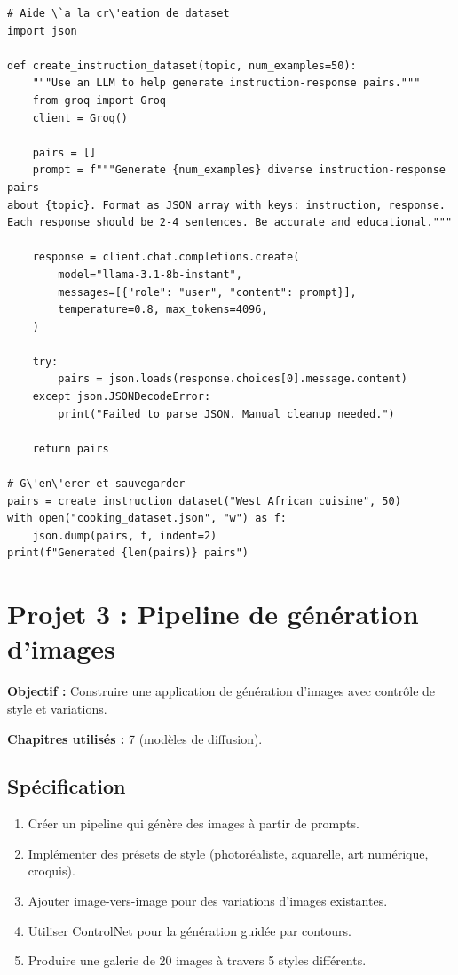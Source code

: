 \begin{verbatim}
# Aide \`a la cr\'eation de dataset
import json

def create_instruction_dataset(topic, num_examples=50):
    """Use an LLM to help generate instruction-response pairs."""
    from groq import Groq
    client = Groq()

    pairs = []
    prompt = f"""Generate {num_examples} diverse instruction-response pairs
about {topic}. Format as JSON array with keys: instruction, response.
Each response should be 2-4 sentences. Be accurate and educational."""

    response = client.chat.completions.create(
        model="llama-3.1-8b-instant",
        messages=[{"role": "user", "content": prompt}],
        temperature=0.8, max_tokens=4096,
    )

    try:
        pairs = json.loads(response.choices[0].message.content)
    except json.JSONDecodeError:
        print("Failed to parse JSON. Manual cleanup needed.")

    return pairs

# G\'en\'erer et sauvegarder
pairs = create_instruction_dataset("West African cuisine", 50)
with open("cooking_dataset.json", "w") as f:
    json.dump(pairs, f, indent=2)
print(f"Generated {len(pairs)} pairs")
\end{verbatim}

\section{Projet 3 : Pipeline de g\'en\'eration d'images}

\textbf{Objectif :} Construire une application de g\'en\'eration d'images avec contr\^ole de style et variations.

\textbf{Chapitres utilis\'es :} 7 (mod\`eles de diffusion).

\subsection{Sp\'ecification}

\begin{enumerate}
  \item Cr\'eer un pipeline qui g\'en\`ere des images \`a partir de prompts.
  \item Impl\'ementer des pr\'esets de style (photor\'ealiste, aquarelle, art num\'erique, croquis).
  \item Ajouter image-vers-image pour des variations d'images existantes.
  \item Utiliser ControlNet pour la g\'en\'eration guid\'ee par contours.
  \item Produire une galerie de 20 images \`a travers 5 styles diff\'erents.
\end{enumerate}

